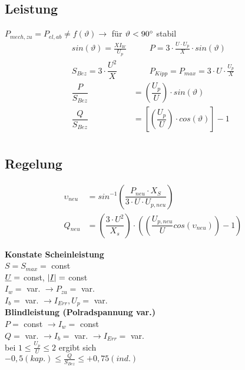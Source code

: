 \subsection{Leistung}
$P_{mech,zu} = P_{el,ab} \neq f(\vartheta) \rightarrow$ für $\vartheta < 90\degree$ stabil\\
\begin{align*}
    sin(\vartheta) = \frac{XI_W}{U_p} & \qquad P = 3 \cdot \frac{U\cdot U_p}{X} \cdot sin(\vartheta)\\
    S_{Bez} = 3 \cdot \dfrac{U^2}{X} & \qquad P_{Kipp} = P_{max} = 3\cdot U \cdot \frac{U_p}{X}\\
    \dfrac{P}{S_{Bez}} &= \left(\dfrac{U_p}{U}\right) \cdot sin(\vartheta)\\
    \dfrac{Q}{S_{Bez}} &= \left[\left(\dfrac{U_p}{U}\right) \cdot cos(\vartheta)\right] -1\\
\end{align*}

\newpage
\subsection{Regelung}

\begin{align*}
    \upsilon_{neu} &= sin^{-1}\left( \dfrac{P_{neu} \cdot X_S}{3 \cdot U \cdot U_{p,neu}}\right)\\
    Q_{neu} &= \left( \dfrac{3 \cdot U^2}{X_s}\right) \cdot \left( \left( \dfrac{U_{p,neu}}{U} cos( \upsilon_{neu})\right)-1\right)
\end{align*}

\textbf{Konstate Scheinleistung}\\
\indent $S = S_{max} =$ const\\
\indent $\underline{U}=$ const, $|\underline{I}| =$ const\\
\indent $I_w =$ var. $\rightarrow P_{zu}=$ var.\\
\indent $I_b =$ var. $\rightarrow I_{Err}, U_p =$ var.\\

\textbf{Blindleistung (Polradspannung var.)}\\
\indent $P =$ const $\rightarrow I_w= $ const\\
\indent $Q =$ var. $\rightarrow I_b = $ var. $\rightarrow I_{Err}=$ var.\\
\indent bei $1 \leq \frac{U_p}{U} \leq 2$ ergibt sich \\
\indent $-0,5 (kap.) \leq \frac{Q}{S_{Bez}} \leq +0,75(ind.)$\\

